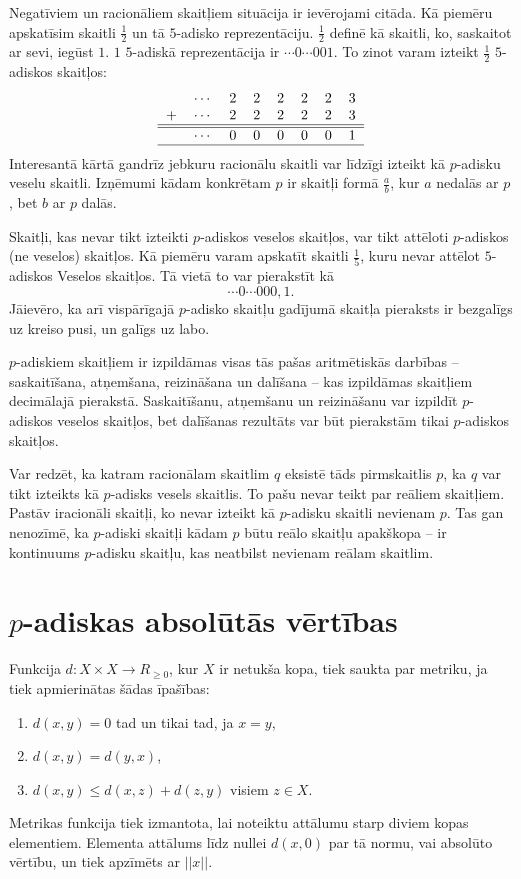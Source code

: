 \documentclass{ludis}
\begin{document}
Negatīviem un racionāliem skaitļiem situācija ir ievērojami citāda. Kā piemēru apskatīsim skaitli $\frac{1}{2}$ un tā $5$-adisko reprezentāciju. $\frac{1}{2}$ definē kā skaitli, ko, saskaitot ar sevi, iegūst $1$. $1$ $5$-adiskā reprezentācija ir $\cdots 0 \cdots 001$. To zinot varam izteikt $\frac{1}{2}$ $5$-adiskos skaitļos:
\[
\begin{tabular}{rrrrrrrrr|}
&$\cdots$ &2 &2 &2 &2 &2 &3\\
+&$\cdots$ &2 &2 &2 &2 &2 &3\\
\hline
\hline
&$\cdots$ &0 &0 &0 &0 &0 &1\\
\hline
\end{tabular}
\]
Interesantā kārtā gandrīz jebkuru racionālu skaitli var līdzīgi izteikt kā $p$-adisku veselu skaitli. %
Izņēmumi kādam konkrētam $p$ ir skaitļi formā $\frac{a}{b}$, kur $a$ nedalās ar $p$, bet $b$ ar $p$ dalās. %

Skaitļi, kas nevar tikt izteikti $p$-adiskos veselos skaitļos, var tikt attēloti $p$-adiskos (ne veselos) skaitļos. Kā piemēru varam apskatīt skaitli $\frac{1}{5}$, kuru nevar attēlot $5$-adiskos Veselos skaitļos. Tā vietā to var pierakstīt kā
\[
\cdots 0 \cdots 000,1.
\]
Jāievēro, ka arī vispārīgajā $p$-adisko skaitļu gadījumā skaitļa pieraksts ir bezgalīgs uz kreiso pusi, un galīgs uz labo.

$p$-adiskiem skaitļiem ir izpildāmas visas tās pašas aritmētiskās darbības -- saskaitīšana, atņemšana, reizināšana un dalīšana -- kas izpildāmas skaitļiem decimālajā pierakstā. Saskaitīšanu, atņemšanu un reizināšanu var izpildīt $p$-adiskos veselos skaitļos, bet dalīšanas rezultāts var būt pierakstām tikai $p$-adiskos skaitļos.

Var redzēt, ka katram racionālam skaitlim $q$ eksistē tāds pirmskaitlis $p$, ka $q$ var tikt izteikts kā $p$-adisks vesels skaitlis. To pašu nevar teikt par reāliem skaitļiem. Pastāv iracionāli skaitļi, ko nevar izteikt kā $p$-adisku skaitli nevienam $p$. Tas gan nenozīmē, ka $p$-adiski skaitļi kādam $p$ būtu reālo skaitļu apakškopa -- ir kontinuums $p$-adisku skaitļu, kas neatbilst nevienam reālam skaitlim. %

\section{$p$-adiskas absolūtās vērtības}
Funkcija $d: X \times X \rightarrow R_{\geq 0}$, kur $X$ ir netukša kopa, tiek saukta par metriku, ja tiek apmierinātas šādas īpašības:
\begin{enumerate}
\item $d(x,y) = 0$ tad un tikai tad, ja $x = y$,
\item $d(x,y) = d(y,x)$,
\item $d(x,y) \leq d(x,z) + d(z,y)$ visiem $z \in X$.
\end{enumerate}
Metrikas funkcija tiek izmantota, lai noteiktu attālumu starp diviem kopas elementiem. Elementa attālums līdz nullei $d(x,0)$ par tā normu, vai absolūto vērtību, un tiek apzīmēts ar $||x||$.
\end{document}
